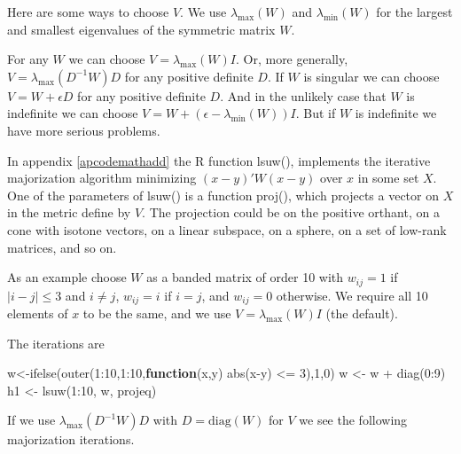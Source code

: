 \documentclass[
  12pt,
]{book}
\newenvironment{Shaded}{\begin{snugshade}}{\end{snugshade}}
\newcommand{\ControlFlowTok}[1]{\textcolor[rgb]{0.13,0.29,0.53}{\textbf{#1}}}
\newcommand{\DecValTok}[1]{\textcolor[rgb]{0.00,0.00,0.81}{#1}}
\newcommand{\FunctionTok}[1]{\textcolor[rgb]{0.00,0.00,0.00}{#1}}
\newcommand{\NormalTok}[1]{#1}
\newcommand{\OtherTok}[1]{\textcolor[rgb]{0.56,0.35,0.01}{#1}}
\newcommand{\SpecialCharTok}[1]{\textcolor[rgb]{0.00,0.00,0.00}{#1}}
\theoremstyle{definition}
\theoremstyle{definition}
\theoremstyle{definition}
\theoremstyle{definition}
\theoremstyle{remark}
\begin{document}
Here are some ways to choose \(V\). We use \(\lambda_{\text{max}}(W)\)
and \(\lambda_{\text{min}}(W)\) for the largest and smallest eigenvalues of the symmetric matrix \(W\).

For any \(W\) we can choose \(V=\lambda_{\text{max}}(W)I\). Or, more generally,
\(V=\lambda_{\text{max}}(D^{-1}W)D\) for any positive definite \(D\). If \(W\) is singular we can choose \(V=W+\epsilon D\) for any positive definite \(D\). And in the unlikely case that \(W\) is indefinite we can choose \(V=W+(\epsilon-\lambda_{\text{min}}(W))I\). But if \(W\) is indefinite we have more
serious problems.

In appendix \ref{apcodemathadd} the
R function lsuw(), implements the iterative majorization algorithm minimizing
\((x-y)'W(x-y)\) over \(x\) in some set \(X\). One of the parameters of lsuw() is a function proj(), which projects a vector on \(X\) in the metric define by
\(V\). The projection could be on the positive orthant, on a cone with isotone vectors, on a linear subspace, on a sphere, on a set of low-rank matrices, and so on.

As an example choose \(W\) as a banded matrix of order 10 with
\(w_{ij}=1\) if \(|i-j|\leq 3\) and \(i\not= j\), \(w_{ij}=i\) if \(i=j\), and \(w_{ij}=0\) otherwise.
We require all 10 elements of \(x\) to be the same, and we use \(V=\lambda_{\text{max}}(W)I\) (the default).

The iterations are

\begin{Shaded}
\begin{Highlighting}[]
\NormalTok{w}\OtherTok{\textless{}{-}}\FunctionTok{ifelse}\NormalTok{(}\FunctionTok{outer}\NormalTok{(}\DecValTok{1}\SpecialCharTok{:}\DecValTok{10}\NormalTok{,}\DecValTok{1}\SpecialCharTok{:}\DecValTok{10}\NormalTok{,}\ControlFlowTok{function}\NormalTok{(x,y) }\FunctionTok{abs}\NormalTok{(x}\SpecialCharTok{{-}}\NormalTok{y) }\SpecialCharTok{\textless{}=} \DecValTok{3}\NormalTok{),}\DecValTok{1}\NormalTok{,}\DecValTok{0}\NormalTok{)}
\NormalTok{w }\OtherTok{\textless{}{-}}\NormalTok{ w }\SpecialCharTok{+} \FunctionTok{diag}\NormalTok{(}\DecValTok{0}\SpecialCharTok{:}\DecValTok{9}\NormalTok{)}
\NormalTok{h1 }\OtherTok{\textless{}{-}} \FunctionTok{lsuw}\NormalTok{(}\DecValTok{1}\SpecialCharTok{:}\DecValTok{10}\NormalTok{, w, projeq)}
\end{Highlighting}
\end{Shaded}

If we use \(\lambda_{\text{max}}(D^{-1}W)D\) with \(D=\text{diag}(W)\) for \(V\) we see the following majorization iterations.
\end{document}
